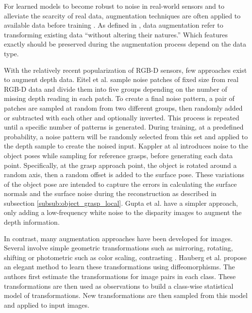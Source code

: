 For learned models to become robust to noise in real-world sensors and to alleviate the scarcity of real data,
augmentation techniques are often applied to available data before training
\cite{Eitel2015,Kappler2015,Gupta2014RGBDFeatures}. As defined in \cite{Gu2018}, data augmentation refer to transforming
existing data ``without altering their natures.'' Which features exactly should be preserved during the augmentation
process depend on the data type.

With the relatively recent popularization of RGB-D sensors, few approaches exist to augment depth data. Eitel et al.
\cite{Eitel2015} sample noise patches of fixed size from real RGB-D data and divide them into five groups depending on
the number of missing depth reading in each patch. To create a final noise pattern, a pair of patches are sampled at
random from two different groups, then randomly added or subtracted with each other and optionally inverted. This
process is repeated until a specific number of patterns is generated. During training, at a predefined probability,
a noise pattern will be randomly selected from this set and applied to the depth sample to create the noised input.
Kappler at al \cite{Kappler2015} introduces noise to the object poses while sampling for reference grasps, before
generating each data point. Specifically, at the grasp approach point, the object is rotated around a random axis, then
a random offset is added to the surface pose. These variations of the object pose are intended to capture the errors in
calculating the surface normals and the surface noise during the reconstruction as described in subsection
\ref{subsub:object_grasp_local}. Gupta et al. \cite{Gupta2014RGBDFeatures} have a simpler approach, only adding a
low-frequency white noise to the disparity images to augment the depth information.

In contrast, many augmentation approaches have been developed for images. Several involve simple geometric
transformations such as mirroring, rotating, shifting \cite{Gu2018} or photometric such as color scaling, contrasting
\cite{Eigen2015}. Hauberg et al. \cite{Hauberg2016Diffeomorphism} propose an elegant method to learn these
transformations using diffeomorphisms. The authors first estimate the transformations for image pairs in each class.
These transformations are then used as observations to build a class-wise statistical model of transformations.
New transformations are then sampled from this model and applied to input images.

